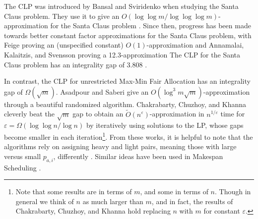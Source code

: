 The CLP was introduced by Bansal and Sviridenko when studying the Santa Claus problem. 
They use it to give an $O(\log \log m / \log \log \log m)$- approximation for the Santa Claus problem  \cite{SantaClaus-BansalSviridenko-STOC2006}. 
Since then, progress has been made towards better constant factor approximations for the Santa Claus problem, 
with Feige proving an (unspecified constant) $O(1)$-approximation and Annamalai, Kalaitzis, and Svensson proving 
a 12.3-approximation \cite{ConstantIntegralityGapSantaClaus-Feige-SODA2008, AlgoForSantaClaus-AnnamalaiKalaitzisSvenssonSODA15}
The CLP for the Santa Claus problem has an integrality gap of $3.808$ \cite{CM19}. 

In contrast, the CLP for unrestricted Max-Min Fair Allocation has an integrality gap of $\Omega(\sqrt{m})$. 
Asadpour and Saberi give an $O(\log^3 m \sqrt{m})$-approximation through a beautiful randomized algorithm. 
Chakrabarty, Chuzhoy, and Khanna cleverly beat the $\sqrt{m}$ gap to obtain an $\tilde{O}(n^{\varepsilon})$-approximation 
in $n^{1/\varepsilon}$ time for $\varepsilon =\Omega \left (  \log \log n / \log n \right )$
by iteratively using solutions to the LP, 
whose gaps become smaller in each iteration\footnote{
Note that some results are in terms of $m$, and some in terms of $n$. Though in general
we think of $n$ as much larger than $m$, and in fact, 
the results of Chakrabarty, Chuzhoy, and Khanna hold replacing $n$ with $m$ for constant $\varepsilon.$
}. 
From these works, it is helpful to note that 
the algorithms rely on assigning heavy and light pairs, meaning those with large versus small $p_{a,i}$,
differently \cite{AlgoForSantaClaus-AnnamalaiKalaitzisSvenssonSODA15,MaxMinFairAllocation-ChakrabartyChuzhoyKhannaFOCS09}. 
Similar ideas have been used in Makespan Scheduling \cite{MakespanScheduling-Svensson-STOC11, SchedulingUnrelatedParallelMachines-LenstraShmoysTardos-FOCS87}.


